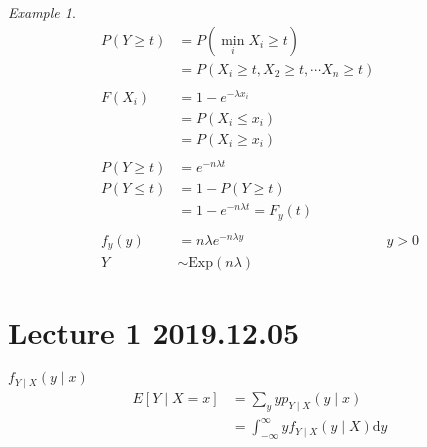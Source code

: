 \documentclass{article}
\let\ddd\cdots
\theoremstyle{definition}
\theoremstyle{remark}
\theoremstyle{example}
\newtheorem*{example}{Example}
\renewcommand{\d}{\mathrm{d}}
\newcommand{\Exp}{\mathrm{Exp}}
\begin{document}
	\begin{example}
		\begin{align*}
			P(Y \geq t)&=P(\min_i X_i \geq t)\\
			&=P(X_i \geq t,X_2 \geq t, \ddd X_n \geq t)\\
			\\
			F(X_i)&=1-e^{-\lambda x_i}\\
			&=P(X_i \leq x_i)\\
			&=P(X_i \geq x_i)\\
			\\
			P(Y \geq t) &= e^{-n \lambda t}\\
			P(Y \leq t)&= 1-P(Y \geq t)\\
			&= 1-e^{-n \lambda t}=F_y(t)\\
			\\
			f_y(y)&=n \lambda e^{-n \lambda y} & y > 0\\
			Y & \sim \Exp (n \lambda)
		\end{align*}
	\end{example}

	\section*{Lecture 1 2019.12.05}
	$f_{Y \mid X}(y \mid x)$
	\begin{align*}
	E[Y\mid X = x]&=\sum_{y} y p_{Y \mid X}(y \mid x)\\
	&= \int_{-\infty}^{\infty}y f_{Y \mid X}(y \mid X) \d y
	\end{align*}
	
\end{document}
